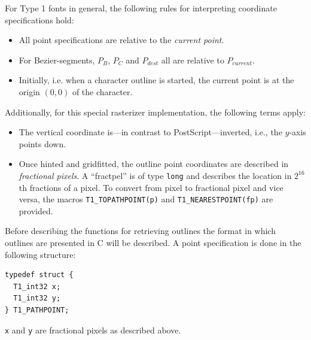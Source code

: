 For Type 1 fonts in general, the following rules for interpreting coordinate
specifications hold:
\begin{itemize}
\item All point specifications are relative to the {\em current
    point}. 
\item For Bezier-segments, $P_{B}$, $P_{C}$ and $P_{dest}$ all are relative to
  $P_{current}$.
\item Initially, i.e. when a character outline is started, the current point
  is at the origin $(0,0)$ of the character.
\end{itemize}
Additionally, for this special rasterizer implementation, the following terms
apply: 
\begin{itemize}
\item The vertical coordinate is---in contrast to PostScript---inverted, i.e.,
  the $y$-axis points down. 
\item Once hinted and gridfitted, the outline point coordinates are described
  in {\em fractional pixels}. A ``fractpel'' is of type \verb+long+ and
  describes the location in $2^{16}$th fractions of a pixel. To convert from
  pixel to fractional pixel and vice versa, the macros
  \verb+T1_TOPATHPOINT(p)+ and
  \verb+T1_NEARESTPOINT(fp)+ are provided. 
\end{itemize}

Before describing the functions for retrieving outlines the format in which
outlines are presented in C will be described. A point specification is done
in the following structure:  
\begin{verbatim}
typedef struct {
  T1_int32 x;
  T1_int32 y;
} T1_PATHPOINT;
\end{verbatim}
\verb+x+ and \verb+y+ are fractional pixels as described above.

